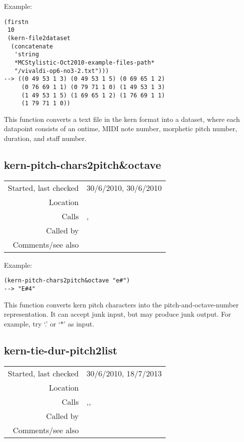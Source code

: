 \vspace{0.5cm}
\noindent Example:
\begin{verbatim}
(firstn
 10
 (kern-file2dataset
  (concatenate
   'string
   *MCStylistic-Oct2010-example-files-path*
   "/vivaldi-op6-no3-2.txt")))
--> ((0 49 53 1 3) (0 49 53 1 5) (0 69 65 1 2)
     (0 76 69 1 1) (0 79 71 1 0) (1 49 53 1 3)
     (1 49 53 1 5) (1 69 65 1 2) (1 76 69 1 1)
     (1 79 71 1 0))
\end{verbatim}

\noindent This function converts a text file in the
kern format into a dataset, where each datapoint
consists of an ontime, MIDI note number, morphetic
pitch number, duration, and staff number.


\subsection*{kern-pitch-chars2pitch\&octave}\label{fun:kern-pitch-chars2pitch-and-octave}

\vspace{0.3cm}
\begin{tabular}{r|p{8cm}}
Started, last checked & 30/6/2010, 30/6/2010 \\
Location & \nameref{sec:kern} \\
Calls & \nameref{fun:accidental-char-p}, \nameref{fun:upcase-p} \\
Called by & \nameref{fun:kern-dur-pitch2pitch-and-octave-dur} \\
Comments/see also &
\end{tabular}

\vspace{0.5cm}
\noindent Example:
\begin{verbatim}
(kern-pitch-chars2pitch&octave "e#")
--> "E#4"
\end{verbatim}

\noindent This function converts kern pitch characters
into the pitch-and-octave-number representation. It
can accept junk input, but may produce junk output.
For example, try `.' or `$\ast$' as input.


\subsection*{kern-tie-dur-pitch2list}\label{fun:kern-tie-dur-pitch2list}

\vspace{0.3cm}
\begin{tabular}{r|p{8cm}}
Started, last checked & 30/6/2010, 18/7/2013 \\
Location & \nameref{sec:kern} \\
Calls & \nameref{fun:kern-dur-pitch2pitch-and-octave-dur},\newline \nameref{fun:number-chars-p}, \nameref{fun:upcase-p} \\
Called by & \nameref{fun:parse-kern-spaced-notes} \\
Comments/see also &
\end{tabular}

